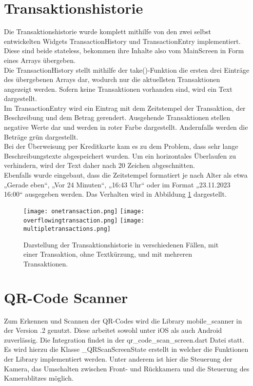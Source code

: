 \section{Transaktionshistorie}
Die Transaktionshistorie wurde komplett mithilfe von den zwei selbst entwickelten Widgets TransactionHistory und TransactionEntry implementiert.
Diese sind beide stateless, bekommen ihre Inhalte also vom MainScreen in Form eines Arrays übergeben.\\
Die TransactionHistory stellt mithilfe der take()-Funktion die ersten drei Einträge des übergebenen Arrays dar, wodurch nur die aktuellsten Transaktionen angezeigt werden.
Sofern keine Transaktionen vorhanden sind, wird ein Text dargestellt.\\
Im TransactionEntry wird ein Eintrag mit dem Zeitstempel der Transaktion, der Beschreibung und dem Betrag gerendert.
Ausgehende Transaktionen stellen negative Werte dar und werden in roter Farbe dargestellt.
Andernfalls werden die Beträge grün dargestellt.\\
Bei der Überweisung per Kreditkarte kam es zu dem Problem, dass sehr lange Beschreibungstexte abgespeichert wurden.
Um ein horizontales Überlaufen zu verhindern, wird der Text daher nach 20 Zeichen abgeschnitten.\\
Ebenfalls wurde eingebaut, dass die Zeitstempel formatiert je nach Alter als etwa „Gerade eben“, „Vor 24 Minuten“, „16:43 Uhr“ oder im Format „23.11.2023 16:00“ ausgegeben werden.
Das Verhalten wird in Abbildung \ref{fig:transactionhistory} dargestellt.

\begin{figure}[H]
  \centering
  \texttt{[image: onetransaction.png]}
  \texttt{[image: overflowingtransaction.png]}
  \texttt{[image: multipletransactions.png]}
  \label{fig:transactionhistory}
  \caption{Darstellung der Transaktionshistorie in verschiedenen Fällen, mit einer Transaktion, ohne Textkürzung, und mit mehreren Transaktionen.}
\end{figure}

\section{QR-Code Scanner}

Zum Erkennen und Scannen der QR-Codes wird die Library \glqq mobile\_scanner\grqq{} in der Version .2\grqq{} genutzt.
Diese arbeitet sowohl unter iOS als auch Android zuverlässig.
Die Integration findet in der \glqq qr\_code\_scan\_screen.dart\grqq{} Datei statt.
Es wird hierzu die Klasse \glqq \_QRScanScreenState\grqq{} erstellt in welcher die Funktionen der Library implementiert werden.
Unter anderem ist hier die Steuerung der Kamera, das Umschalten zwischen Front- und Rückkamera und die Steuerung des Kamerablitzes möglich.

